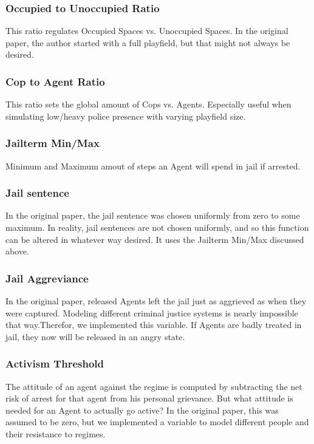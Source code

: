 \documentclass[11pt]{article}
\begin{document}
\subsubsection{Occupied to Unoccupied Ratio}
This ratio regulates Occupied Spaces vs. Unoccupied Spaces. In the original paper, the author started with a full playfield, but that might not always be desired.

\subsubsection{Cop to Agent Ratio}
This ratio sets the global amount of Cops vs. Agents. Especially useful when simulating low/heavy police presence with varying playfield size.

\subsubsection{Jailterm Min/Max}    
Minimum and Maximum amout of steps an Agent will spend in jail if arrested.

\subsubsection{Jail sentence}
In the original paper, the jail sentence was chosen uniformly from zero to some maximum. In reality, jail sentences are not chosen uniformly, and so this function can be altered in whatever way desired. It uses the Jailterm Min/Max discussed above.

\subsubsection{Jail Aggreviance}
In the original paper, released Agents left the jail just as aggrieved as when they were captured. Modeling different criminal justice systems is nearly impossible that way.Therefor, we implemented this variable. If Agents are badly treated in jail, they now will be released in an angry state.

\subsubsection{Activism Threshold}
The attitude of an agent against the regime is computed by subtracting the net risk of arrest for that agent from his personal grievance. But what attitude is needed for an Agent to actually go active? In the original paper, this was assumed to be zero, but we implemented a variable to model different people and their resistance to regimes.
\end{document}
